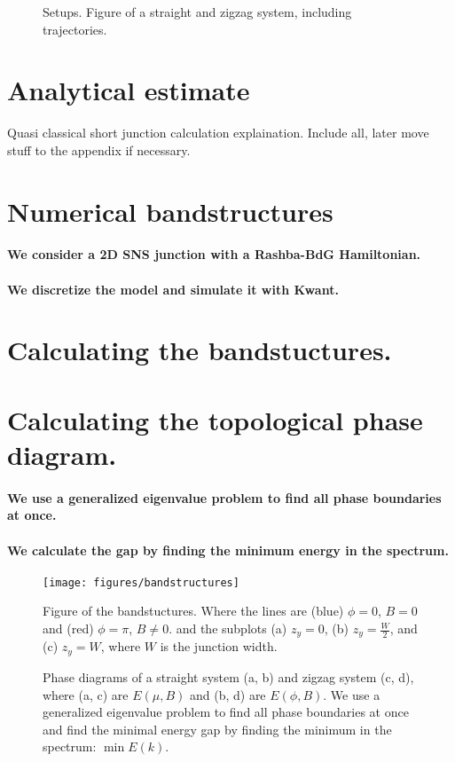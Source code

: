 \documentclass[english, twocolumn, 10pt, aps, superscriptaddress, floatfix, prb, citeautoscript]{revtex4-1}
\renewcommand{\comment}[2]{#2}
\renewcommand{\comment}{\paragraph}
\begin{document}
\begin{figure}
\caption{Setups. Figure of a straight and zigzag system, including trajectories.
\label{fig:setup}}
\end{figure}


\section{Analytical estimate}

Quasi classical short junction calculation explaination.
Include all, later move stuff to the appendix if necessary.


\section{Numerical bandstructures}

\comment{We consider a 2D SNS junction with a Rashba-BdG Hamiltonian.}

\comment{We discretize the model and simulate it with Kwant.}

\section{Calculating the bandstuctures.}

\section{Calculating the topological phase diagram.}

\comment{We use a generalized eigenvalue problem to find all phase boundaries at once.}

\comment{We calculate the gap by finding the minimum energy in the spectrum.}

\begin{figure}
\texttt{[image: figures/bandstructures]}
\caption{Figure of the bandstuctures.
Where the lines are (blue) $\phi=0$, $B=0$ and (red) $\phi=\pi$, $B \ne 0$.
and the subplots (a) $z_y=0$, (b) $z_y=\frac{W}{2}$, and (c) $z_y=W$, where $W$ is the junction width.
\label{fig:bandstuctures}}
\end{figure}

\begin{figure}
\caption{Phase diagrams of a straight system (a, b) and zigzag system (c, d), where (a, c) are $E(\mu, B)$ and (b, d) are $E(\phi, B)$.
We use a generalized eigenvalue problem to find all phase boundaries at once and find the minimal energy gap by finding the minimum in the spectrum: $\min{E(k)}$.
\label{fig:phasediagrams}}
\end{figure}
\end{document}
